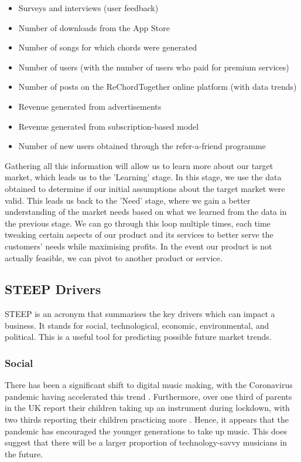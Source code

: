\begin{itemize}
    \item Surveys and interviews (user feedback)
    \item Number of downloads from the App Store
    \item Number of songs for which chords were generated
    \item Number of users (with the number of users who paid for premium services)
    \item Number of posts on the ReChordTogether online platform (with data trends)
    \item Revenue generated from advertisements
    \item Revenue generated from subscription-based model
    \item Number of new users obtained through the refer-a-friend programme
  \end{itemize}

  Gathering all this information will allow us to learn more about our target market, which leads us to the 'Learning' stage. In this stage, we use the data obtained to determine if our initial assumptions about the target market were valid. This leads us back to the 'Need' stage, where we gain a better understanding of the market needs based on what we learned from the data in the previous stage. We can go through this loop multiple times, each time tweaking certain aspects of our product and its services to better serve the customers' needs while maximising profits. In the event our product is not actually feasible, we can pivot to another product or service.

  \subsection{STEEP Drivers}
  \label{STEEP Drivers}

  STEEP is an acronym that summarises the key drivers which can impact a business. It stands for social, technological, economic, environmental, and political. This is a useful tool for predicting possible future market trends.

  \subsubsection{Social}
  There has been a significant shift to digital music making, with the Coronavirus pandemic having accelerated this trend \cite{abrsm2021}. Furthermore, over one third of parents in the UK report their children taking up an instrument during lockdown, with two thirds reporting their children practicing more \cite{abrsm2021}. Hence, it appears that the pandemic has encouraged the younger generations to take up music. This does suggest that there will be a larger proportion of technology-savvy musicians in the future.

